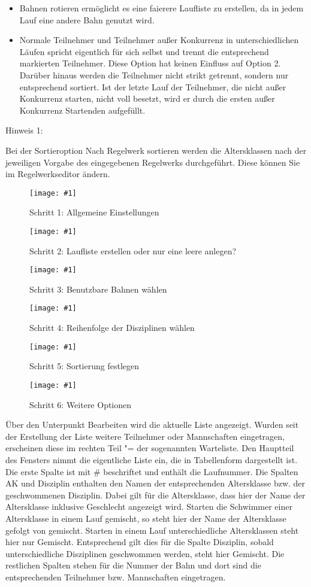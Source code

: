 \documentclass[11pt,a4paper,twoside,ngerman]{article}
\newcommand{\hsmimage}[3]{\begin{figure}[!ht]\centering\texttt{[image: \#1]}\caption{#3}\end{figure}}
\begin{document}
\begin{itemize}
\begin{itemize}
\item \glqq{}Bahnen rotieren\grqq{} ermöglicht es eine faierere Laufliste zu erstellen, da in jedem Lauf eine andere Bahn genutzt wird.


\item \glqq{}Normale Teilnehmer und Teilnehmer außer Konkurrenz in unterschiedlichen Läufen\grqq{} spricht eigentlich für sich selbst und trennt die entsprechend markierten Teilnehmer. Diese Option hat keinen Einfluss auf Option 2. Darüber hinaus werden die Teilnehmer nicht strikt getrennt, sondern nur entsprechend sortiert. Ist der letzte Lauf der Teilnehmer, die nicht außer Konkurrenz starten, nicht voll besetzt, wird er durch die ersten außer Konkurrenz Startenden aufgefüllt.


\end{itemize}



\end{itemize}
\begin{bfseries}Hinweis 1:\end{bfseries} Bei der Sortieroption \glqq{}Nach Regelwerk sortieren\grqq{} werden die Altersklassen nach der jeweiligen Vorgabe des eingegebenen Regelwerks durchgeführt. Diese können Sie im Regelwerkseditor ändern.


\hsmimage{pics/laufliste-neu-1}{.49\textwidth}{Schritt 1: Allgemeine Einstellungen}

\hsmimage{pics/laufliste-neu-2}{.49\textwidth}{Schritt 2: Laufliste erstellen oder nur eine leere anlegen?}

\hsmimage{pics/laufliste-neu-3}{.50\textwidth}{Schritt 3: Benutzbare Bahnen wählen}

\hsmimage{pics/laufliste-neu-4}{.50\textwidth}{Schritt 4: Reihenfolge der Disziplinen wählen}

\hsmimage{pics/laufliste-neu-5}{.50\textwidth}{Schritt 5: Sortierung festlegen}

\hsmimage{pics/laufliste-neu-6}{.50\textwidth}{Schritt 6: Weitere Optionen}
Über den Unterpunkt \glqq{}Bearbeiten\grqq{} wird die aktuelle Liste angezeigt. Wurden seit der Erstellung der Liste weitere Teilnehmer oder Mannschaften eingetragen, erscheinen diese im rechten Teil "= der sogenannten \glqq{}Warteliste\grqq{}. Den Hauptteil des Fensters nimmt die eigentliche Liste ein, die in Tabellenform dargestellt ist. Die erste Spalte ist mit \glqq{}\#\grqq{} beschriftet und enthält die Laufnummer. Die Spalten \glqq{}AK\grqq{} und \glqq{}Disziplin\grqq{} enthalten den Namen der entsprechenden Altersklasse bzw. der geschwommenen Disziplin. Dabei gilt für die Altersklasse, dass hier der Name der Altersklasse inklusive Geschlecht angezeigt wird. Starten die Schwimmer einer Altersklasse in einem Lauf gemischt, so steht hier der Name der Altersklasse gefolgt von \glqq{}gemischt\grqq{}. Starten in einem Lauf unterschiedliche Altersklassen steht hier nur \glqq{}Gemischt\grqq{}. Entsprechend gilt dies für die Spalte \glqq{}Disziplin\grqq{}, sobald unterschiedliche Disziplinen geschwommen werden, steht hier \glqq{}Gemischt\grqq{}. Die restlichen Spalten stehen für die Nummer der Bahn und dort sind die entsprechenden Teilnehmer bzw. Mannschaften eingetragen.
\end{document}
